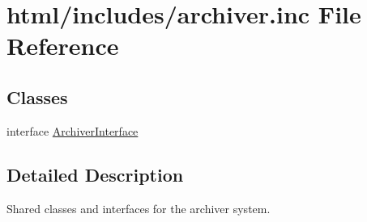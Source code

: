 \hypertarget{archiver_8inc}{
\section{html/includes/archiver.inc File Reference}
\label{archiver_8inc}
}
\subsection*{Classes}
\begin{DoxyCompactItemize}
\item 
interface \hyperlink{interfaceArchiverInterface}{ArchiverInterface}
\end{DoxyCompactItemize}


\subsection{Detailed Description}
Shared classes and interfaces for the archiver system. 